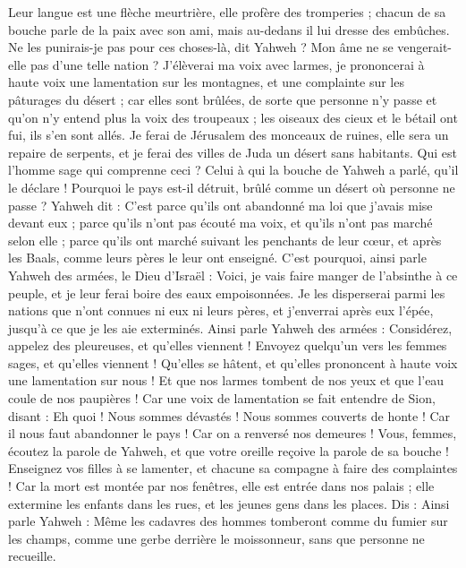 \begin{multicols}{2}
Leur langue est une flèche meurtrière, elle profère des tromperies ; chacun de sa bouche parle de la paix avec son ami, mais au-dedans il lui dresse des embûches.
Ne les punirais-je pas pour ces choses-là, dit Yahweh ? Mon âme ne se vengerait-elle pas d'une telle nation ?
J'élèverai ma voix avec larmes, je prononcerai à haute voix une lamentation sur les montagnes, et une complainte sur les pâturages du désert ; car elles sont brûlées, de sorte que personne n'y passe et qu'on n'y entend plus la voix des troupeaux ; les oiseaux des cieux et le bétail ont fui, ils s'en sont allés.
Je ferai de Jérusalem des monceaux de ruines, elle sera un repaire de serpents, et je ferai des villes de Juda un désert sans habitants.
Qui est l'homme sage qui comprenne ceci ? Celui à qui la bouche de Yahweh a parlé, qu'il le déclare ! Pourquoi le pays est-il détruit, brûlé comme un désert où personne ne passe ?
Yahweh dit : C'est parce qu'ils ont abandonné ma loi que j'avais mise devant eux ; parce qu'ils n'ont pas écouté ma voix, et qu'ils n'ont pas marché selon elle ;
parce qu'ils ont marché suivant les penchants de leur cœur, et après les Baals, comme leurs pères le leur ont enseigné.
C'est pourquoi, ainsi parle Yahweh des armées, le Dieu d'Israël : Voici, je vais faire manger de l'absinthe à ce peuple, et je leur ferai boire des eaux empoisonnées.
Je les disperserai parmi les nations que n'ont connues ni eux ni leurs pères, et j'enverrai après eux l'épée, jusqu'à ce que je les aie exterminés.
Ainsi parle Yahweh des armées : Considérez, appelez des pleureuses, et qu'elles viennent ! Envoyez quelqu'un vers les femmes sages, et qu'elles viennent !
Qu'elles se hâtent, et qu'elles prononcent à haute voix une lamentation sur nous ! Et que nos larmes tombent de nos yeux et que l'eau coule de nos paupières !
Car une voix de lamentation se fait entendre de Sion, disant : Eh quoi ! Nous sommes dévastés ! Nous sommes couverts de honte ! Car il nous faut abandonner le pays ! Car on a renversé nos demeures !
Vous, femmes, écoutez la parole de Yahweh, et que votre oreille reçoive la parole de sa bouche ! Enseignez vos filles à se lamenter, et chacune sa compagne à faire des complaintes !
Car la mort est montée par nos fenêtres, elle est entrée dans nos palais ; elle extermine les enfants dans les rues, et les jeunes gens dans les places.
Dis : Ainsi parle Yahweh : Même les cadavres des hommes tomberont comme du fumier sur les champs, comme une gerbe derrière le moissonneur, sans que personne ne recueille.

\end{multicols}
